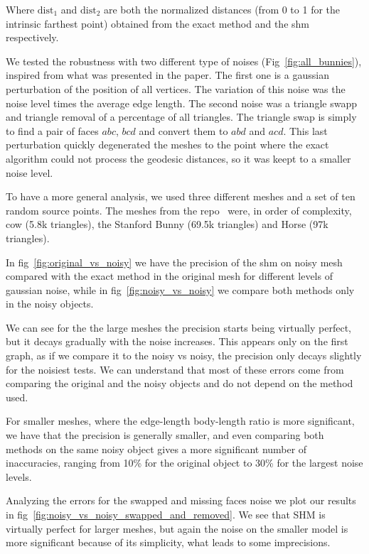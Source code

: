 \documentclass[sigconf, nonacm]{acmart}
\begin{document}
Where $\text{dist}_1$ and $\text{dist}_2$ are both the normalized distances (from 0 to 1 for the intrinsic farthest point) obtained from the exact method and the shm respectively.

We tested the robustness with two different type of noises (Fig~\ref{fig:all_bunnies}), inspired from what was presented in the paper. 
The first one is a gaussian perturbation of the position of all vertices. The variation of this noise was the noise level times the average edge length.
The second noise was a triangle swapp and triangle removal of a percentage of all triangles.
The triangle swap is simply to find a pair of faces $abc$, $bcd$ and convert them to $abd$ and $acd$.
This last perturbation quickly degenerated the meshes to the point where the exact algorithm could not
process the geodesic distances, so it was keept to a smaller noise level. 

To have a more general analysis, we used three different meshes and a set of ten random
source points. The meshes from the repo~\cite{github_objects_repo} were, in order of complexity, cow (5.8k triangles), the Stanford Bunny (69.5k triangles) and Horse (97k triangles).

In fig~\ref{fig:original_vs_noisy} we have the precision of the shm on noisy mesh compared with the exact method in the original mesh for
different levels of gaussian noise, while in fig~\ref{fig:noisy_vs_noisy} we compare both methods only in the noisy objects.

We can see for the the large meshes the precision starts being virtually perfect, but it
decays gradually with the noise increases. This appears only on the first graph, as if we compare it to the noisy vs noisy, the precision
only decays slightly for the noisiest tests. We can understand that most of these errors come from comparing the original and the noisy objects
and do not depend on the method used.

For smaller meshes, where the edge-length body-length ratio is more significant, we have that the precision is generally smaller,
and even comparing both methods on the same noisy object gives a more significant number of inaccuracies, ranging from 10\% for the
original object to 30\% for the largest noise levels.

Analyzing the errors for the swapped and missing faces noise we plot our results
in fig~\ref{fig:noisy_vs_noisy_swapped_and_removed}. We see that SHM is virtually perfect
for larger meshes, but again the noise on the smaller model is more significant because
of its simplicity, what leads to some imprecisions. 
\end{document}
